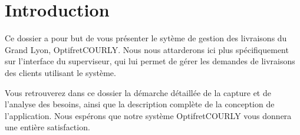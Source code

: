 \chapter*{Introduction}

Ce dossier a pour but de vous présenter le sytème de gestion des livraisons du Grand Lyon, Optifret\textunderscore COURLY.
Nous nous attarderons ici plus spécifiquement sur l'interface du superviseur, qui lui permet de gérer les demandes de
livraisons des clients utilisant le système.

Vous retrouverez dans ce dossier la démarche détaillée de la capture et de l'analyse des besoins, ainsi que la
description complète de la conception de l'application. Nous espérons que notre système Optifret\textunderscore COURLY vous donnera
une entière satisfaction.

